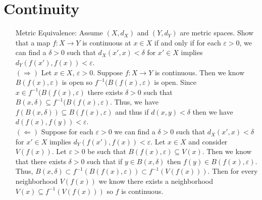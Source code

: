 \documentclass[12pt]{article} %
\theoremstyle{definition}
\begin{document}
\section*{Continuity}
\begin{enumerate}
    \item[Metric Equivalence:]  Assume $(X,d_{X})$ and $(Y,d_{Y})$ are metric spaces.
Show that a map $f:X\rightarrow Y$ is continuous at $x\in X$ if and only if for each $\varepsilon>0$, we can find a $\delta>0$ such that $d_{X}(x',x)<\delta$ for $x'\in X$ implies $d_{Y}(f(x'),f(x))<\varepsilon$.
\vspace{5mm}
\\
$(\Rightarrow)$ Let $x\in X$, $\varepsilon>0$.
Suppose $f:X\rightarrow Y$ is continuous.
Then we know $B(f(x),\varepsilon)$ is open so $f^{-1}(B(f(x),\varepsilon)$ is open.
Since $x\in f^{-1}(B(f(x),\varepsilon)$ there exists $\delta>0$ such that $B(x,\delta)\subseteq f^{-1}(B(f(x),\varepsilon)$.
Thus, we have $f(B(x,\delta))\subseteq B(f(x),\varepsilon)$ and thus if $d(x,y)<\delta$ then we have $d(f(x),f(y))<\varepsilon$.\\
$(\Leftarrow)$ Suppose for each $\varepsilon>0$ we can find a $\delta>0$ such that $d_{X}(x',x)<\delta$ for $x'\in X$ implies $d_{Y}(f(x'),f(x))<\varepsilon$.
Let $x\in X$ and consider $V(f(x))$.
Let $\varepsilon>0$ be such that $B(f(x),\varepsilon)\subseteq V(x)$.
Then we know that there exists $\delta>0$ such that if $y\in B(x,\delta)$ then $f(y)\in B(f(x),\varepsilon)$.
Thus, $B(x,\delta)\subset f^{-1}(B(f(x),\varepsilon))\subset f^{-1}(V(f(x)))$.
Then for every neighborhood $V(f(x))$ we know there exists a neighborhood $V(x)\subseteq f^{-1}(V(f(x)))$ so $f$ is continuous.
\end{enumerate}
\end{document}
